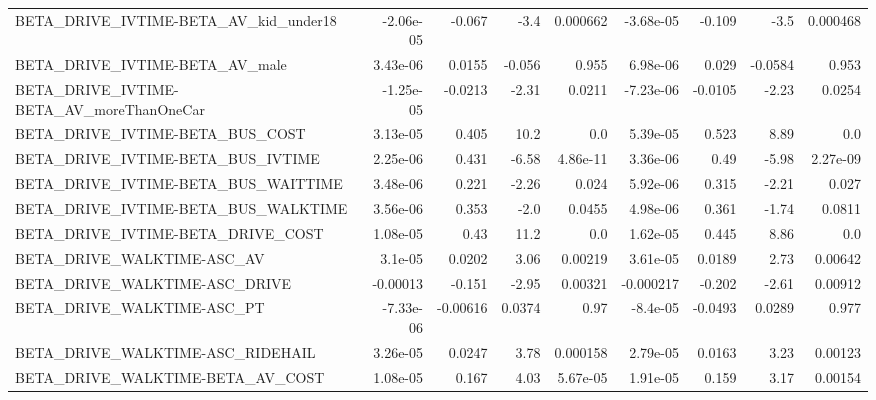 \begin{tabular}{lrrrrrrrr}
BETA\_DRIVE\_IVTIME-BETA\_AV\_kid\_under18              &   -2.06e-05 &       -0.067 &      -3.4 & 0.000662 &  -3.68e-05 &      -0.109 &         -3.5 &      0.000468 \\
BETA\_DRIVE\_IVTIME-BETA\_AV\_male                     &    3.43e-06 &       0.0155 &    -0.056 &    0.955 &   6.98e-06 &       0.029 &      -0.0584 &         0.953 \\
BETA\_DRIVE\_IVTIME-BETA\_AV\_moreThanOneCar           &   -1.25e-05 &      -0.0213 &     -2.31 &   0.0211 &  -7.23e-06 &     -0.0105 &        -2.23 &        0.0254 \\
BETA\_DRIVE\_IVTIME-BETA\_BUS\_COST                    &    3.13e-05 &        0.405 &      10.2 &      0.0 &   5.39e-05 &       0.523 &         8.89 &           0.0 \\
BETA\_DRIVE\_IVTIME-BETA\_BUS\_IVTIME                  &    2.25e-06 &        0.431 &     -6.58 & 4.86e-11 &   3.36e-06 &        0.49 &        -5.98 &      2.27e-09 \\
BETA\_DRIVE\_IVTIME-BETA\_BUS\_WAITTIME                &    3.48e-06 &        0.221 &     -2.26 &    0.024 &   5.92e-06 &       0.315 &        -2.21 &         0.027 \\
BETA\_DRIVE\_IVTIME-BETA\_BUS\_WALKTIME                &    3.56e-06 &        0.353 &      -2.0 &   0.0455 &   4.98e-06 &       0.361 &        -1.74 &        0.0811 \\
BETA\_DRIVE\_IVTIME-BETA\_DRIVE\_COST                  &    1.08e-05 &         0.43 &      11.2 &      0.0 &   1.62e-05 &       0.445 &         8.86 &           0.0 \\
BETA\_DRIVE\_WALKTIME-ASC\_AV                         &     3.1e-05 &       0.0202 &      3.06 &  0.00219 &   3.61e-05 &      0.0189 &         2.73 &       0.00642 \\
BETA\_DRIVE\_WALKTIME-ASC\_DRIVE                      &    -0.00013 &       -0.151 &     -2.95 &  0.00321 &  -0.000217 &      -0.202 &        -2.61 &       0.00912 \\
BETA\_DRIVE\_WALKTIME-ASC\_PT                         &   -7.33e-06 &     -0.00616 &    0.0374 &     0.97 &   -8.4e-05 &     -0.0493 &       0.0289 &         0.977 \\
BETA\_DRIVE\_WALKTIME-ASC\_RIDEHAIL                   &    3.26e-05 &       0.0247 &      3.78 & 0.000158 &   2.79e-05 &      0.0163 &         3.23 &       0.00123 \\
BETA\_DRIVE\_WALKTIME-BETA\_AV\_COST                   &    1.08e-05 &        0.167 &      4.03 & 5.67e-05 &   1.91e-05 &       0.159 &         3.17 &       0.00154 \\

\end{tabular}
